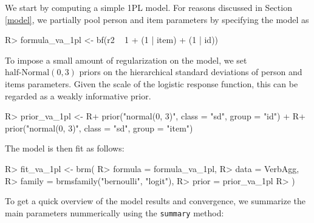 \documentclass[jss]{jss}
\begin{document}
We start by computing a simple 1PL model. For reasons discussed in
Section \ref{model}, we partially pool person and item parameters by
specifying the model as

\begin{CodeChunk}

\begin{CodeInput}
R> formula_va_1pl <- bf(r2 ~ 1 + (1 | item) + (1 | id))
\end{CodeInput}
\end{CodeChunk}

To impose a small amount of regularization on the model, we set
\(\text{half-Normal}(0, 3)\) priors on the hierarchical standard
deviations of person and items parameters. Given the scale of the
logistic response function, this can be regarded as a weakly informative
prior.

\begin{CodeChunk}

\begin{CodeInput}
R> prior_va_1pl <- 
R+   prior("normal(0, 3)", class = "sd", group = "id") + 
R+   prior("normal(0, 3)", class = "sd", group = "item")
\end{CodeInput}
\end{CodeChunk}

The model is then fit as follows:

\begin{CodeChunk}

\begin{CodeInput}
R> fit_va_1pl <- brm(
R>   formula = formula_va_1pl,
R>   data = VerbAgg, 
R>   family = brmsfamily("bernoulli", "logit"),
R>   prior = prior_va_1pl
R> )
\end{CodeInput}
\end{CodeChunk}

To get a quick overview of the model results and convergence, we
summarize the main parameters nummerically using the \texttt{summary}
method:
\end{document}
